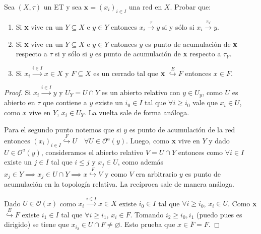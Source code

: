 \documentclass{article}
\theoremstyle{plain}
\theoremstyle{definition}
\newcommand{\cl}[1]{\overline{#1}}              %
\newcommand{\evto}[1]{\stackrel{E}{\hookrightarrow} #1}   %
\newcommand{\frto}[1]{\stackrel{F}{\hookrightarrow} #1}   %
\newenvironment{ejercicio}[1]{\begin{trivlist}
\item[\hskip \labelsep {\bfseries Ejercicio}\hskip \labelsep {\bfseries #1.}]}{\end{trivlist}}
\begin{document}
\begin{ejercicio}{3}
    Sea \( (X, \tau) \) un ET y sea \( \mathbf{x} = {(x_i)}_{i \in I} \) una red en \( X \). Probar que:
    \begin{enumerate}
        \item Si \textbf{x} vive en un \( Y \subseteq X \) e \( y \in Y \) entonces \( x_i \xrightarrow{\tau} y \) si y sólo si \( x_i \xrightarrow{\tau_Y} y \).
        \item Si \textbf{x}  vive en un \( Y \subseteq X \) e \( y \in Y \) entonces \( y \) es punto de acumulación de \textbf{x} respecto a \( \tau \) si y sólo si \( y \) es punto de acumulación de \textbf{x} respecto a \( \tau_Y \).
        \item Si \( x_i \xrightarrow{i \in I} x \in X \) y \( F \subseteq X \) es un cerrado tal que \textbf{x} \( \evto{F} \) entonces \( x \in F \).
    \end{enumerate}
\end{ejercicio}
\begin{proof}
    Si \( x_i \xrightarrow{i \in I} y \) y \( U_Y = U \cap Y \) es un abierto relativo con \( y \in U_y \), como \( U \) es abierto en \( \tau \) que contiene a \( y \)
    existe un \( i_0 \in I \) tal que \( \forall i \geq i_0 \) vale que \( x_i \in U \), como \( x \) vive en \( Y \), \( x_i \in U_Y \). La vuelta sale de forma análoga.

    Para el segundo punto notemos que si \( y \) es punto de acumulación de la red entonces \( {(x_i)}_{i \in I} \frto{U} \quad \forall U \in \mathcal{O}^a(y) \). Luego,
    como \textbf{x} vive en \( Y \) y dado \( U \in \mathcal{O}^a(y) \), consideramos el abierto relativo \( V = U \cap Y \) entonces como \( \forall i \in I \) existe un \( j \in I \) tal que \( i \leq j \) y
    \( x_j \in U \), como además \( x_j \in Y \implies x_j \in U \cap Y \implies x \frto{V} \) y como \( V \) era arbitrario \( y \) es punto de acumulación en la topología relativa. La recíproca sale de manera análoga.

    Dado \( U \in \mathcal{O}(x) \) como \( x_i \xrightarrow{i \in I} x \in X \) existe \( i_0 \in I \) tal que \( \forall i \geq i_0 \), \( x_i \in U \).
    Como \textbf{x} \( \evto{F} \) existe \( i_1 \in I \) tal que \( \forall i \geq i_1 \), \( x_i \in F \). Tomando \( i_2 \geq i_0, i_1 \) (puedo pues es dirigido) se tiene que
    \( x_{i_2} \in U \cap F \neq \varnothing \). Esto prueba que \( x \in \cl{F} = F \).
\end{proof}
\end{document}
